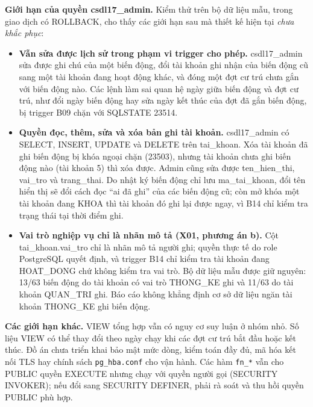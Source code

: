 \textbf{Giới hạn của quyền csdl17\_admin.} Kiểm thử trên bộ dữ liệu mẫu, trong giao dịch có ROLLBACK, cho thấy các giới hạn sau mà thiết kế hiện tại \emph{chưa khắc phục}:
\begin{itemize}[leftmargin=*]
    \item \textbf{Vẫn sửa được lịch sử trong phạm vi trigger cho phép.} csdl17\_admin sửa được ghi chú của một biến động, đổi tài khoản ghi nhận của biến động cũ sang một tài khoản đang hoạt động khác, và đóng một đợt cư trú chưa gắn với biến động nào. Các lệnh làm sai quan hệ ngày giữa biến động và đợt cư trú, như đổi ngày biến động hay sửa ngày kết thúc của đợt đã gắn biến động, bị trigger B09 chặn với SQLSTATE 23514.
    \item \textbf{Quyền đọc, thêm, sửa và xóa bản ghi tài khoản.} csdl17\_admin có SELECT, INSERT, UPDATE và DELETE trên tai\_khoan. Xóa tài khoản đã ghi biến động bị khóa ngoại chặn (23503), nhưng tài khoản chưa ghi biến động nào (tài khoản 5) thì xóa được. Admin cũng sửa được ten\_hien\_thi, vai\_tro và trang\_thai. Do nhật ký biến động chỉ lưu ma\_tai\_khoan, đổi tên hiển thị sẽ đổi cách đọc ``ai đã ghi'' của các biến động cũ; còn mở khóa một tài khoản đang KHOA thì tài khoản đó ghi lại được ngay, vì B14 chỉ kiểm tra trạng thái tại thời điểm ghi.
    \item \textbf{Vai trò nghiệp vụ chỉ là nhãn mô tả (X01, phương án b).} Cột tai\_khoan.vai\_tro chỉ là nhãn mô tả người ghi; quyền thực tế do role PostgreSQL quyết định, và trigger B14 chỉ kiểm tra tài khoản đang HOAT\_DONG chứ không kiểm tra vai trò. Bộ dữ liệu mẫu được giữ nguyên: 13/63 biến động do tài khoản có vai trò THONG\_KE ghi và 11/63 do tài khoản QUAN\_TRI ghi. Báo cáo không khẳng định cơ sở dữ liệu ngăn tài khoản THONG\_KE ghi biến động.
\end{itemize}

\textbf{Các giới hạn khác.} VIEW tổng hợp vẫn có nguy cơ suy luận ở nhóm nhỏ. Số liệu VIEW có thể thay đổi theo ngày chạy khi các đợt cư trú bắt đầu hoặc kết thúc. Đồ án chưa triển khai bảo mật mức dòng, kiểm toán đầy đủ, mã hóa kết nối TLS hay chính sách \texttt{pg\_hba.conf} cho vận hành. Các hàm \texttt{fn\_*} vẫn cho PUBLIC quyền EXECUTE nhưng chạy với quyền người gọi (SECURITY INVOKER); nếu đổi sang SECURITY DEFINER, phải rà soát và thu hồi quyền PUBLIC phù hợp.